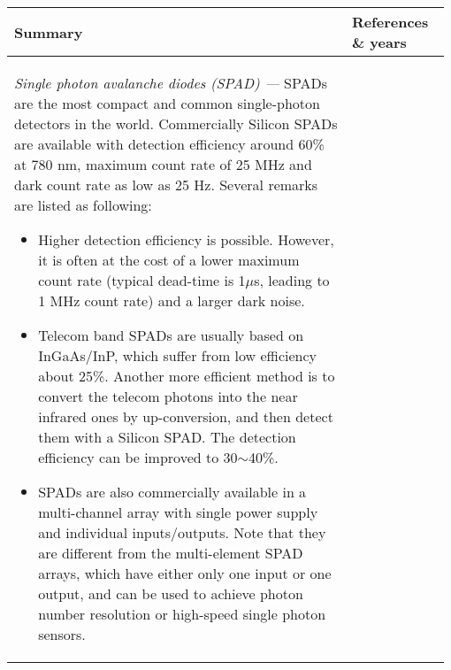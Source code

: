 \begin{table*}[!htbp]
	\begin{tabular}{|p{0.755\linewidth}|p{0.22\linewidth}|}
		\hline
		Summary & References \& years \\
		\hline \hline
		{\em Single photon avalanche diodes (SPAD) ---}
		SPADs are the most compact and common single-photon detectors in the world. Commercially Silicon SPADs are available with detection efficiency around 60\% at 780 nm, maximum count rate of 25 MHz and dark count rate as low as 25 Hz. Several remarks are listed as following:
		
		\begin{itemize}
			
			\item Higher detection efficiency is possible. However, it is often at the cost of a lower maximum count rate (typical dead-time is 1$\mu$s, leading to 1 MHz count rate) and a larger dark noise.
			
			\item Telecom band SPADs are usually based on InGaAs/InP, which suffer from low efficiency about 25\%. Another more efficient method is to convert the telecom photons into the near infrared ones by up-conversion, and then detect them with a Silicon SPAD. The detection efficiency can be improved to 30$\sim$40\%.
			
			\item SPADs are also commercially available in a multi-channel array with single power supply and individual inputs/outputs. Note that they are different from the multi-element SPAD arrays, which have either only one input or one output, and can be used to achieve photon number resolution or high-speed single photon sensors.
			

\end{itemize}
\end{tabular}
\end{table*}
